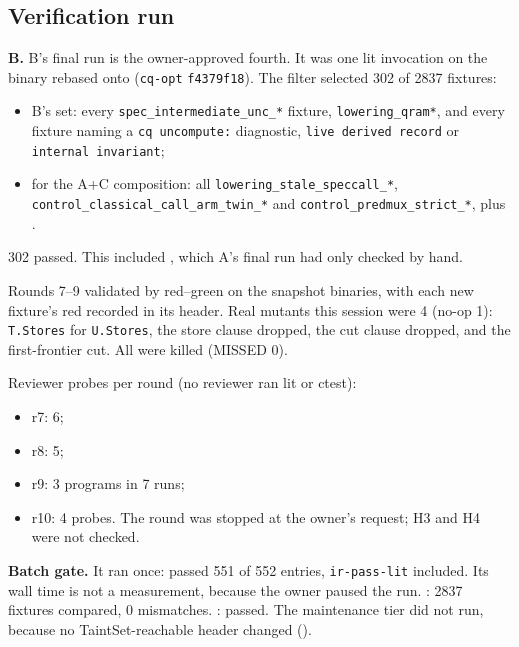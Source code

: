\subsection*{Verification run}
\textbf{B.} B's final run is the owner-approved fourth. It was one lit invocation on the binary rebased onto  (\texttt{cq-opt} \texttt{f4379f18}). The filter selected 302 of 2837 fixtures:
\begin{itemize}
\item B's set: every \texttt{spec\_intermediate\_unc\_*} fixture, \texttt{lowering\_qram*}, and every fixture naming a \texttt{cq uncompute:} diagnostic, \texttt{live derived record} or \texttt{internal invariant};
\item for the A+C composition: all \texttt{lowering\_stale\_speccall\_*}, \texttt{control\_classical\_call\_arm\_twin\_*} and \texttt{control\_predmux\_strict\_*}, plus .
\end{itemize}
302 passed. This included , which A's final run had only checked by hand.

Rounds 7--9 validated by red--green on the snapshot binaries, with each new fixture's red recorded in its header. Real mutants this session were 4 (no-op 1): \texttt{T.Stores} for \texttt{U.Stores}, the store clause dropped, the cut clause dropped, and the first-frontier cut. All were killed (MISSED 0).

Reviewer probes per round (no reviewer ran lit or ctest):
\begin{itemize}
\item r7: 6;
\item r8: 5;
\item r9: 3 programs in 7 runs;
\item r10: 4 probes. The round was stopped at the owner's request; H3 and H4 were not checked.
\end{itemize}

\textbf{Batch gate.} It ran once:  passed 551 of 552 entries, \texttt{ir-pass-lit} included. Its wall time is not a measurement, because the owner paused the run. : 2837 fixtures compared, 0 mismatches. : passed. The maintenance tier did not run, because no TaintSet-reachable header changed ().

